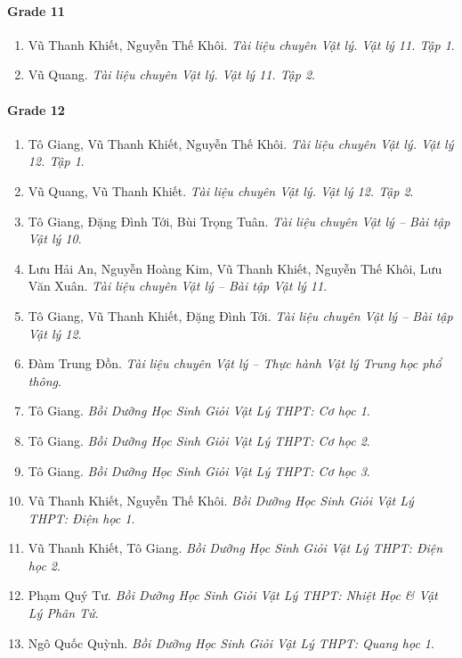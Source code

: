 \documentclass{article}
\begin{document}
\paragraph{Grade 11}

\begin{enumerate}
	\item Vũ Thanh Khiết, Nguyễn Thế Khôi. {\it Tài liệu chuyên Vật lý. Vật lý 11. Tập 1}.
	\item Vũ Quang. {\it Tài liệu chuyên Vật lý. Vật lý 11. Tập 2}.
\end{enumerate}

\paragraph{Grade 12}

\begin{enumerate}	
	\item Tô Giang, Vũ Thanh Khiết, Nguyễn Thế Khôi. {\it Tài liệu chuyên Vật lý. Vật lý 12. Tập 1}.
	\item Vũ Quang, Vũ Thanh Khiết. {\it Tài liệu chuyên Vật lý. Vật lý 12. Tập 2}.
	\item Tô Giang, Đặng Đình Tới, Bùi Trọng Tuân. {\it Tài liệu chuyên Vật lý -- Bài tập Vật lý 10}.
	\item Lưu Hải An, Nguyễn Hoàng Kim, Vũ Thanh Khiết, Nguyễn Thế Khôi, Lưu Văn Xuân. {\it Tài liệu chuyên Vật lý -- Bài tập Vật lý 11}.
	\item Tô Giang, Vũ Thanh Khiết, Đặng Đình Tới. {\it Tài liệu chuyên Vật lý -- Bài tập Vật lý 12}.
	\item Đàm Trung Đồn. {\it Tài liệu chuyên Vật lý -- Thực hành Vật lý Trung học phổ thông}.
	\item Tô Giang. {\it Bồi Dưỡng Học Sinh Giỏi Vật Lý THPT: Cơ học 1}.\hfill{\sf[reading]}
	\item Tô Giang. {\it Bồi Dưỡng Học Sinh Giỏi Vật Lý THPT: Cơ học 2}.\hfill{\sf[reading]}
	\item Tô Giang. {\it Bồi Dưỡng Học Sinh Giỏi Vật Lý THPT: Cơ học 3}.\hfill{\sf[reading]}
	\item Vũ Thanh Khiết, Nguyễn Thế Khôi. {\it Bồi Dưỡng Học Sinh Giỏi Vật Lý THPT: Điện học 1}.\hfill{\sf[reading]}
	\item Vũ Thanh Khiết, Tô Giang. {\it Bồi Dưỡng Học Sinh Giỏi Vật Lý THPT: Điện học 2}.\hfill{\sf[reading]}
	\item Phạm Quý Tư. {\it Bồi Dưỡng Học Sinh Giỏi Vật Lý THPT: Nhiệt Học \& Vật Lý Phân Tử}.
	\item Ngô Quốc Quỳnh. {\it Bồi Dưỡng Học Sinh Giỏi Vật Lý THPT: Quang học 1}.\hfill{\sf[reading]}

\end{enumerate}
\end{document}
